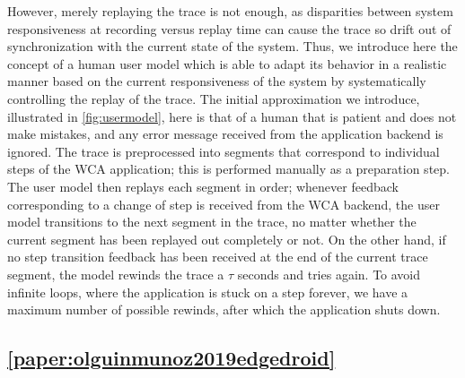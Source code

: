 However, merely replaying the trace is not enough, as disparities between system responsiveness at recording versus replay time can cause the trace so drift out of synchronization with the current state of the system.
Thus, we introduce here the concept of a human user model which is able to adapt its behavior in a realistic manner based on the current responsiveness of the system by systematically controlling the replay of the trace.
The initial approximation we introduce, illustrated in \cref{fig:usermodel}, here is that of a human that is patient and does not make mistakes, and any error message received from the application backend is ignored.
The trace is preprocessed into segments that correspond to individual steps of the \ac{WCA} application; this is performed manually as a preparation step.
The user model then replays each segment in order; whenever feedback corresponding to a change of step is received from the \ac{WCA} backend, the user model transitions to the next segment in the trace, no matter whether the current segment has been replayed out completely or not.
On the other hand, if no step transition feedback has been received at the end of the current trace segment, the model rewinds the trace a $\tau$ seconds and tries again.
To avoid infinite loops, where the application is stuck on a step forever, we have a maximum number of possible rewinds, after which the application shuts down.


\subsection{\cref{paper:olguinmunoz2019edgedroid}}\label{summary:2019edgedroid}

